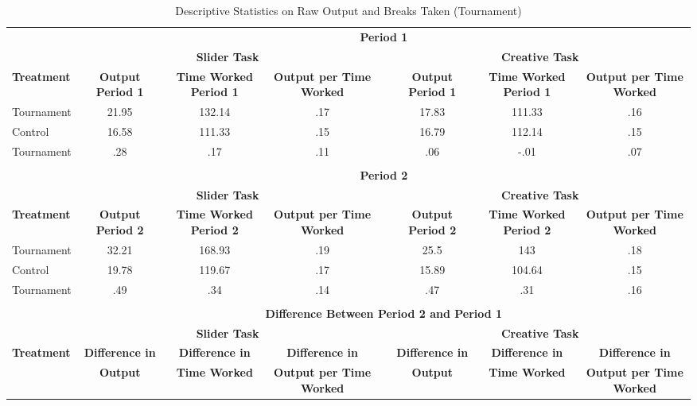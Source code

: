 \begin{landscape}
\begin{table}[h]%
\setlength\tabcolsep{2pt}
\caption{Descriptive Statistics on Raw Output and Breaks Taken (Tournament)}
\begin{center}%
{\small\renewcommand{\arraystretch}{1}%
\begin{tabular}{lccccccc}
\hline\hline\noalign{\smallskip}
 & \multicolumn{7}{c}{\bf Period 1} \\
& \multicolumn{3}{c}{\bf Slider Task} & & \multicolumn{3}{c}{\bf Creative Task} \\ \cline{2-4} \cline{6-8}
\bf Treatment & \bf Output Period 1 & \bf Time Worked Period 1 & \bf Output per Time Worked && \bf Output Period 1 & \bf Time Worked Period 1 & \bf Output per Time Worked \\
\hline
Tournament & 21.95 & 132.14 & .17 && 17.83 & 111.33 & .16 \\
Control & 16.58 & 111.33 & .15 && 16.79 & 112.14 & .15 \\
Tournament & .28 & .17 & .11 && .06 & -.01 & .07 \\
 \\
 & \multicolumn{7}{c}{\bf Period 2} \\
& \multicolumn{3}{c}{\bf Slider Task} & & \multicolumn{3}{c}{\bf Creative Task} \\ \cline{2-4} \cline{6-8}
\bf Treatment & \bf Output Period 2 & \bf Time Worked Period 2 & \bf Output per Time Worked && \bf Output Period 2 & \bf Time Worked Period 2 & \bf Output per Time Worked \\
\hline
Tournament & 32.21 & 168.93 & .19 && 25.5 & 143 & .18 \\
Control & 19.78 & 119.67 & .17 && 15.89 & 104.64 & .15 \\
Tournament & .49 & .34 & .14 && .47 & .31 & .16 \\
 \\
 & \multicolumn{7}{c}{\bf Difference Between Period 2 and Period 1} \\
& \multicolumn{3}{c}{\bf Slider Task} & & \multicolumn{3}{c}{\bf Creative Task} \\ \cline{2-4} \cline{6-8}
\bf Treatment & \bf Difference in & \bf Difference in & \bf Difference in              && \bf Difference in & \bf Difference in & \bf Difference in            \\
& \bf Output            & \bf Time Worked       & \bf Output per Time Worked && \bf Output              & \bf Time Worked       & \bf Output per Time Worked \\

\end{tabular}}
\end{center}
\end{table}
\end{landscape}
